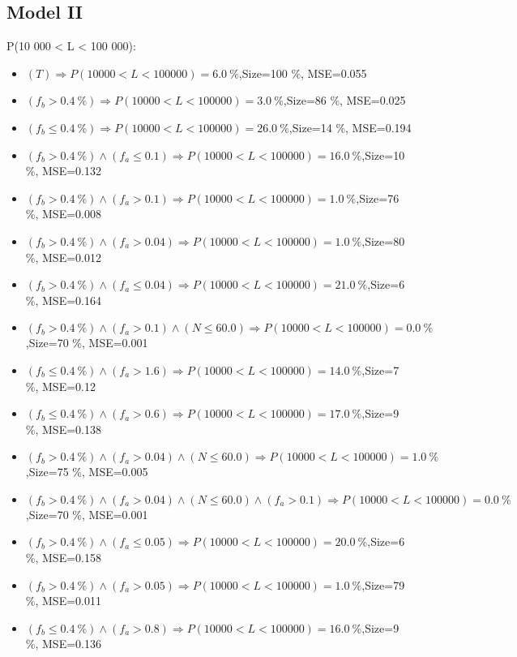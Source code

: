 \documentclass[numbered]{CSL}
\begin{document}
\subsection{Model II}
P(10 000 < L < 100 000):
\begin{itemize}
\item $(T) \Rightarrow P(10 000 < L < 100 000) = 6.0~\%$,\hfill Size=100 \%, MSE=0.055
\item $(f_b > 0.4~\%) \Rightarrow P(10 000 < L < 100 000) = 3.0~\%$,\hfill Size=86 \%, MSE=0.025
\item $(f_b \leq 0.4~\%) \Rightarrow P(10 000 < L < 100 000) = 26.0~\%$,\hfill Size=14 \%, MSE=0.194
\item $(f_b > 0.4~\%) \land (f_a \leq 0.1) \Rightarrow P(10 000 < L < 100 000) = 16.0~\%$,\hfill Size=10 \%, MSE=0.132
\item $(f_b > 0.4~\%) \land (f_a > 0.1) \Rightarrow P(10 000 < L < 100 000) = 1.0~\%$,\hfill Size=76 \%, MSE=0.008
\item $(f_b > 0.4~\%) \land (f_a > 0.04) \Rightarrow P(10 000 < L < 100 000) = 1.0~\%$,\hfill Size=80 \%, MSE=0.012
\item $(f_b > 0.4~\%) \land (f_a \leq 0.04) \Rightarrow P(10 000 < L < 100 000) = 21.0~\%$,\hfill Size=6 \%, MSE=0.164
\item $(f_b > 0.4~\%) \land (f_a > 0.1) \land (N \leq 60.0) \Rightarrow P(10 000 < L < 100 000) = 0.0~\%$,\hfill Size=70 \%, MSE=0.001
\item $(f_b \leq 0.4~\%) \land (f_a > 1.6) \Rightarrow P(10 000 < L < 100 000) = 14.0~\%$,\hfill Size=7 \%, MSE=0.12
\item $(f_b \leq 0.4~\%) \land (f_a > 0.6) \Rightarrow P(10 000 < L < 100 000) = 17.0~\%$,\hfill Size=9 \%, MSE=0.138
\item $(f_b > 0.4~\%) \land (f_a > 0.04) \land (N \leq 60.0) \Rightarrow P(10 000 < L < 100 000) = 1.0~\%$,\hfill Size=75 \%, MSE=0.005
\item $(f_b > 0.4~\%) \land (f_a > 0.04) \land (N \leq 60.0) \land (f_a > 0.1) \Rightarrow P(10 000 < L < 100 000) = 0.0~\%$,\hfill Size=70 \%, MSE=0.001
\item $(f_b > 0.4~\%) \land (f_a \leq 0.05) \Rightarrow P(10 000 < L < 100 000) = 20.0~\%$,\hfill Size=6 \%, MSE=0.158
\item $(f_b > 0.4~\%) \land (f_a > 0.05) \Rightarrow P(10 000 < L < 100 000) = 1.0~\%$,\hfill Size=79 \%, MSE=0.011
\item $(f_b \leq 0.4~\%) \land (f_a > 0.8) \Rightarrow P(10 000 < L < 100 000) = 16.0~\%$,\hfill Size=9 \%, MSE=0.136

\end{itemize}
\end{document}
